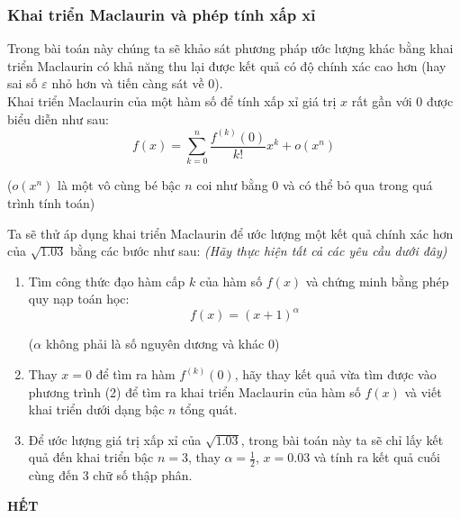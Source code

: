 \documentclass[9pt]{extarticle}
\begin{document}
\subsubsection{Khai triển Maclaurin và phép tính xấp xỉ}
Trong bài toán này chúng ta sẽ khảo sát phương pháp ước lượng khác bằng khai triển Maclaurin có khả năng thu lại được kết quả có độ chính xác cao hơn (hay sai số $\varepsilon$ nhỏ hơn và tiến càng sát về $0$).
\\ Khai triển Maclaurin của một hàm số để tính xấp xỉ giá trị $x$ rất gần với $0$ được biểu diễn như sau:
\begin{equation}
f(x)=\sum_{k=0}^{n}\frac{f^{(k)}(0)}{k!}x^k+o(x^n)
\end{equation}
\begin{center}
    ($o(x^n)$ là một vô cùng bé bậc $n$ coi như bằng $0$ và có thể bỏ qua trong quá trình tính toán)
\end{center}
Ta sẽ thử áp dụng khai triển Maclaurin để ước lượng một kết quả chính xác hơn của $\sqrt{1.03}$ bằng các bước như sau: \textit{(Hãy thực hiện tất cả các yêu cầu dưới đây)}
\begin{enumerate}
    \item Tìm công thức đạo hàm cấp $k$ của hàm số $f(x)$ và chứng minh bằng phép quy nạp toán học: $$f(x)=(x+1)^{\alpha}$$ 
    \begin{center}
    ($\alpha$ không phải là số nguyên dương và khác $0$)
    \end{center}
    \item Thay $x=0$ để tìm ra hàm $f^{(k)}(0)$, hãy thay kết quả vừa tìm được vào phương trình (2) để tìm ra khai triển Maclaurin của hàm số $f(x)$ và viết khai triển dưới dạng bậc $n$ tổng quát.
    \item Để ước lượng giá trị xấp xỉ của $\sqrt{1.03}$, trong bài toán này ta sẽ chỉ lấy kết quả đến khai triển bậc $n=3$, thay $\alpha=\frac{1}{2}$, $x=0.03$ và tính ra kết quả cuối cùng đến 3 chữ số thập phân.
\end{enumerate}
\begin{center}
    \textbf{HẾT}
\end{center}
\end{document}
